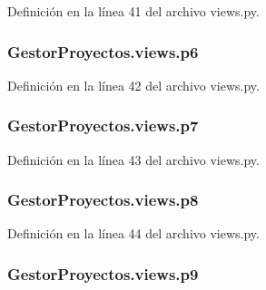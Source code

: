 Definición en la línea 41 del archivo views.\+py.

\subsubsection[{\texorpdfstring{p6}{p6}}]{\setlength{\rightskip}{0pt plus 5cm}Gestor\+Proyectos.\+views.\+p6}\hypertarget{namespace_gestor_proyectos_1_1views_ad7cbf606ac8d632847236af7e0bb8742}{}\label{namespace_gestor_proyectos_1_1views_ad7cbf606ac8d632847236af7e0bb8742}


Definición en la línea 42 del archivo views.\+py.

\subsubsection[{\texorpdfstring{p7}{p7}}]{\setlength{\rightskip}{0pt plus 5cm}Gestor\+Proyectos.\+views.\+p7}\hypertarget{namespace_gestor_proyectos_1_1views_a5f31e59239d3e7f66991072392702bff}{}\label{namespace_gestor_proyectos_1_1views_a5f31e59239d3e7f66991072392702bff}


Definición en la línea 43 del archivo views.\+py.

\subsubsection[{\texorpdfstring{p8}{p8}}]{\setlength{\rightskip}{0pt plus 5cm}Gestor\+Proyectos.\+views.\+p8}\hypertarget{namespace_gestor_proyectos_1_1views_a5a392cc2481d7be7838e1a153420e366}{}\label{namespace_gestor_proyectos_1_1views_a5a392cc2481d7be7838e1a153420e366}


Definición en la línea 44 del archivo views.\+py.

\subsubsection[{\texorpdfstring{p9}{p9}}]{\setlength{\rightskip}{0pt plus 5cm}Gestor\+Proyectos.\+views.\+p9}\hypertarget{namespace_gestor_proyectos_1_1views_adc255a0b01a63f9081d7226371c61450}{}\label{namespace_gestor_proyectos_1_1views_adc255a0b01a63f9081d7226371c61450}


